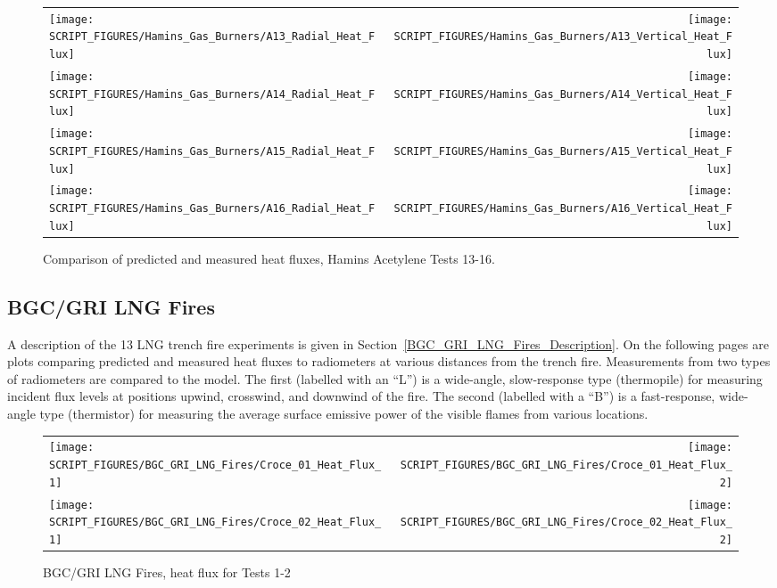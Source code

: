 \begin{figure}[p]
\begin{tabular*}{\textwidth}{l@{\extracolsep{\fill}}r}
\texttt{[image: SCRIPT\_FIGURES/Hamins\_Gas\_Burners/A13\_Radial\_Heat\_Flux]} &
\texttt{[image: SCRIPT\_FIGURES/Hamins\_Gas\_Burners/A13\_Vertical\_Heat\_Flux]} \\
\texttt{[image: SCRIPT\_FIGURES/Hamins\_Gas\_Burners/A14\_Radial\_Heat\_Flux]} &
\texttt{[image: SCRIPT\_FIGURES/Hamins\_Gas\_Burners/A14\_Vertical\_Heat\_Flux]} \\
\texttt{[image: SCRIPT\_FIGURES/Hamins\_Gas\_Burners/A15\_Radial\_Heat\_Flux]} &
\texttt{[image: SCRIPT\_FIGURES/Hamins\_Gas\_Burners/A15\_Vertical\_Heat\_Flux]} \\
\texttt{[image: SCRIPT\_FIGURES/Hamins\_Gas\_Burners/A16\_Radial\_Heat\_Flux]} &
\texttt{[image: SCRIPT\_FIGURES/Hamins\_Gas\_Burners/A16\_Vertical\_Heat\_Flux]}
\end{tabular*}
\label{Hamins_Acetylene_13-16}
\caption[Heat flux predictions, Hamins acetylene burner Tests 13-16]
{Comparison of predicted and measured heat fluxes, Hamins Acetylene Tests 13-16.}
\end{figure}

\clearpage

\subsection{BGC/GRI LNG Fires}

A description of the 13 LNG trench fire experiments is given in Section~\ref{BGC_GRI_LNG_Fires_Description}. On the following pages are plots comparing predicted and measured heat fluxes to radiometers at various distances from the trench fire. Measurements from two types of radiometers are compared to the model. The first (labelled with an ``L'') is a wide-angle, slow-response type (thermopile) for measuring incident flux levels at positions upwind, crosswind, and downwind of the fire. The second (labelled with a ``B'') is a fast-response, wide-angle type (thermistor) for measuring the average surface emissive power of the visible flames from various locations.

\begin{figure}[!h]
\begin{tabular*}{\textwidth}{l@{\extracolsep{\fill}}r}
\texttt{[image: SCRIPT\_FIGURES/BGC\_GRI\_LNG\_Fires/Croce\_01\_Heat\_Flux\_1]} &
\texttt{[image: SCRIPT\_FIGURES/BGC\_GRI\_LNG\_Fires/Croce\_01\_Heat\_Flux\_2]} \\
\texttt{[image: SCRIPT\_FIGURES/BGC\_GRI\_LNG\_Fires/Croce\_02\_Heat\_Flux\_1]} &
\texttt{[image: SCRIPT\_FIGURES/BGC\_GRI\_LNG\_Fires/Croce\_02\_Heat\_Flux\_2]}
\end{tabular*}
\caption[BGC/GRI LNG Fires, heat flux for Tests 1-2]
{BGC/GRI LNG Fires, heat flux for Tests 1-2}
\label{Croce_Heat_Flux_1}
\end{figure}

